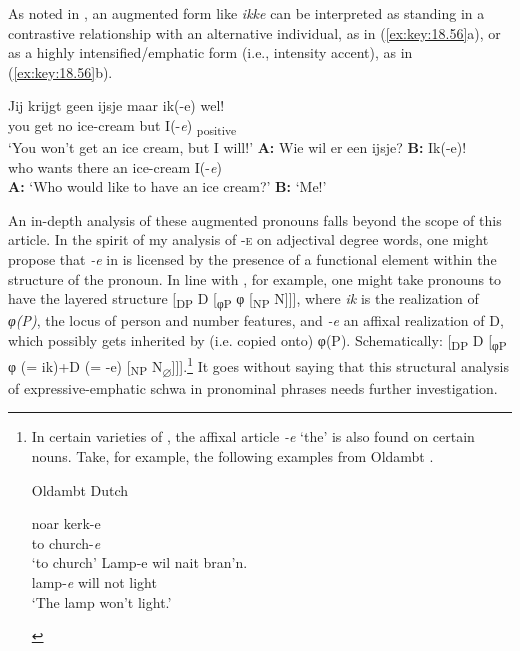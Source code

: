\documentclass[output=paper]{langsci/langscibook}
\begin{document}
As noted in \citet{Zwart2001}, an augmented form like \emph{ikke} can be
interpreted as standing in a contrastive relationship with an alternative
individual, as in (\ref{ex:key:18.56}a), or as a highly intensified/emphatic
form (i.e., intensity accent), as in (\ref{ex:key:18.56}b).

\ea%
    \label{ex:key:18.56}
	\ea
	\gll Jij   krijgt    geen  ijsje            maar  ik(-e)    wel!\\
		you  get        no      ice-cream  but      I(-\emph{e})      \Ptcl{}\textsubscript{positive}\\
	\glt \enquote*{You won}t get an ice cream, but I will!'
	\ex
	\gll \textbf{A:} Wie    wil        er        een    ijsje?            \textbf{B:}  Ik(-e)!\\
		{}  who    wants    there  an    ice-cream    {}  I(-\emph{e})\\
	\glt \textbf{A:} \enquote*{Who would like to have an ice cream?} \textbf{B:} \enquote*{Me!}
	\z
\z

An in-depth analysis of these augmented pronouns falls beyond the scope of this
article. In the spirit of my analysis of \textsc{-e} on adjectival degree
words, one might propose that \emph{-e} in  is licensed by the
presence of a functional element within the structure of the pronoun. In line
with \citet{DechWil2002}, for example, one might take pronouns to
have the layered structure [\textsubscript{DP} D [\textsubscript{φP} φ
[\textsubscript{NP} N]]], where \emph{ik} is the realization of \emph{φ(P)},
the locus of person and number features, and \emph{-e} an affixal realization
of D, which possibly gets inherited by (i.e. copied onto) φ(P). Schematically:
[\textsubscript{DP} D [\textsubscript{φP} φ (= ik)+D (= -e) [\textsubscript{NP}
N\textsubscript{${\varnothing}$}]]].\footnote{In certain varieties of
    , the affixal article \emph{-e} \enquote*{the} is also found on
    certain nouns. Take, for example, the following examples from Oldambt
     \citep[101]{Schuringa1923}.

\begin{exe}
     Oldambt Dutch
    \begin{xlist}
    \ex
	\gll noar kerk-e\\
		to church-\emph{e}\\
	\glt \enquote*{to church}
	\ex
	\gll  Lamp-e wil nait bran'n.\\
		lamp-\emph{e} will not light \\
	\glt \enquote*{The lamp won't light.}
    \end{xlist}
\end{exe}} It goes without saying that this structural analysis of
expressive-emphatic schwa in pronominal phrases needs further investigation.
\end{document}
